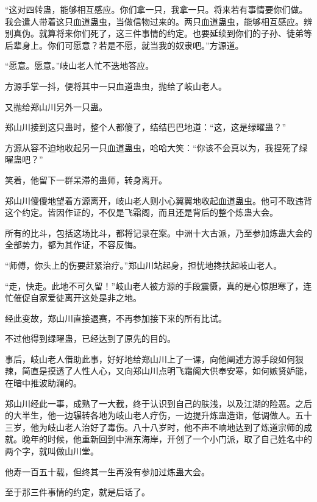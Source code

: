 \begin{this_body}
“这对四转蛊，能够相互感应。你们拿一只，我拿一只。将来若有事情要你们做。我会遣人带着这只血道蛊虫，当做信物过来的。两只血道蛊虫，能够相互感应。辨别真伪。就算将来你们死了，这三件事情的约定。也要延续到你们的子孙、徒弟等后辈身上。你们可愿意？若是不愿，就当我的奴隶吧。”方源道。

“愿意。愿意。”岐山老人忙不迭地答应。

方源手掌一抖，便将其中一只血道蛊虫，抛给了岐山老人。

又抛给郑山川另外一只蛊。

郑山川接到这只蛊时，整个人都傻了，结结巴巴地道：“这，这是绿曜蛊？”

方源从容不迫地收起另一只血道蛊虫，哈哈大笑：“你该不会真以为，我捏死了绿曜蛊吧？”

笑着，他留下一群呆滞的蛊师，转身离开。

郑山川傻傻地望着方源离开，岐山老人则小心翼翼地收起血道蛊虫。他可不敢违背这个约定。皆因作证的，不仅是飞霜阁，而且还是背后的整个炼蛊大会。

所有的比斗，包括这场比斗，都将记录在案。中洲十大古派，乃至参加炼蛊大会的全部势力，都为其作证，不容反悔。

“师傅，你头上的伤要赶紧治疗。”郑山川站起身，担忧地搀扶起岐山老人。

“走，快走。此地不可久留！”岐山老人被方源的手段震慑，真的是心惊胆寒了，连忙催促自家爱徒离开这处是非之地。

经此变故，郑山川直接退赛，不再参加接下来的所有比试。

不过他得到绿曜蛊，已经达到了原先的目的。

事后，岐山老人借助此事，好好地给郑山川上了一课，向他阐述方源手段如何狠辣，简直是摸透了人性人心，又向郑山川点明飞霜阁大供奉安寒，如何嫉贤妒能，在暗中推波助澜的。

郑山川经此一事，成熟了一大截，终于认识到自己的肤浅，以及江湖的险恶。之后的大半生，他一边辗转各地为岐山老人疗伤，一边提升炼蛊造诣，低调做人。五十三岁，他为岐山老人治好了毒伤。八十八岁时，他不声不响地达到了炼道宗师的成就。晚年的时候，他重新回到中洲东海岸，开创了一个小门派，取了自己姓名中的两个字，就叫做山川堂。

他寿一百五十载，但终其一生再没有参加过炼蛊大会。

至于那三件事情的约定，就是后话了。

\end{this_body}


